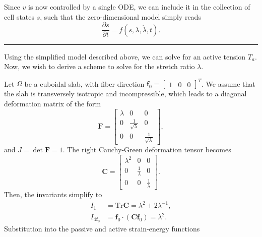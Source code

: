 Since \(v\) is now controlled by a single ODE, we can include it in the
collection of cell states \(s\), such that the zero-dimensional model
simply reads \[
\begin{equation}
\frac{ \partial s }{ \partial t } =f(s,\lambda,\dot{\lambda},t).
\end{equation}
\]

\begin{center}\rule{0.5\linewidth}{0.5pt}\end{center}

Using the simplified model described above, we can solve for an active
tension \(T_{a}\). Now, we wish to derive a scheme to solve for the
stretch ratio \(\lambda\).

Let \(\Omega\) be a cuboidal slab, with fiber direction
\(\mathbf{f}_{0}=\begin{bmatrix}1&0&0\end{bmatrix}^T\). We assume that
the slab is transversely isotropic and incompressible, which leads to a
diagonal deformation matrix of the form \[
\begin{equation}
\mathbf{F}=\begin{bmatrix}
\lambda & 0 & 0 \\
0 & \frac{1}{\sqrt{ \lambda }} & 0 \\
0 & 0 & \frac{1}{\sqrt{ \lambda }} 
\end{bmatrix},
\end{equation}
\] and \(J=\det \mathbf{F}=1\). The right Cauchy-Green deformation
tensor becomes \[
\begin{equation}
\mathbf{C}=\begin{bmatrix}
\lambda^2 & 0 & 0 \\
0 & \frac{1}{\lambda} & 0 \\
0 & 0 & \frac{1}{\lambda} 
\end{bmatrix}.
\end{equation}
\] Then, the invariants simplify to \[
\begin{align}
I_{1} & =\mathrm{Tr}\mathbf{C}=\lambda^2+2\lambda^{-1}, \\
I_{4\mathbf{f}_{0}} & =\mathbf{f}_{0}\cdot(\mathbf{C}\mathbf{f}_{0})=\lambda^2.
\end{align}
\] Substitution into the passive and active strain-energy functions
